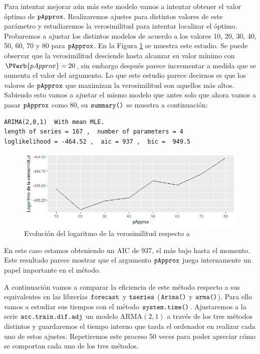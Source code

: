 Para intentar mejorar aún más este modelo vamos a intentar obtener el valor óptimo de $\verb!pApprox!$. Realizaremos ajustes para distintos valores de este parámetro y estudiaremos la verosimilitud para intentar localizar el óptimo. Probaremos a ajustar los distintos modelos de acuerdo a los valores 10, 20, 30, 40, 50, 60, 70 y 80 para $\verb!pApprox!$. En la Figura \ref{logaritmo} se muestra este estudio. Se puede observar que la verosimilitud desciende hasta alcanzar su valor mínimo con $\PVerb{pApprox} = 20$, sin embargo después parece incrementar a medida que se aumenta el valor del argumento. Lo que este estudio parece decirnos es que los valores de $\verb!pApprox!$ que maximizan la verosimilitud son aquellos más altos. Sabiendo esto vamos a ajustar el mismo modelo que antes solo que ahora vamos a pasar $\verb!pApprox!$ como 80, su $\verb!summary()!$ se muestra a continuación:
\begin{Verbatim}[fontsize=\footnotesize]
ARIMA(2,0,1)  With mean MLE.
length of series = 167 ,  number of parameters = 4
loglikelihood = -464.52 ,  aic = 937 ,  bic =  949.5
\end{Verbatim}

\begin{figure}
    \centering
    \centerline{\includegraphics[scale = 0.7]{Images/Modelizacion/330.png}}
    \caption{Evolución del logaritmo de la verosimilitud respecto a }
    \label{logaritmo}
\end{figure}

En este caso estamos obteniendo un AIC de 937, el más bajo hasta el momento. Este resultado parece mostrar que el argumento $\verb!pApprox!$ juega internamente un papel importante en el método.

A continuación vamos a comparar la eficiencia de este método respecto a sus equivalentes en las librerías $\verb!forecast!$ y $\verb!tseries!$ ($\verb!Arima()!$ y $\verb!arma()!$). Para ello vamos a estudiar sus tiempos con el método $\verb!system.time()!$. Ajustaremos a la serie $\verb!acc.train.dif.adj!$ un modelo ARMA$(2,1)$ a través de los tres métodos distintos y guardaremos el tiempo interno que tarda el ordenador en realizar cada uno de estos ajustes. Repetiremos este proceso 50 veces para poder apreciar cómo se comportan cada uno de los tres métodos.

